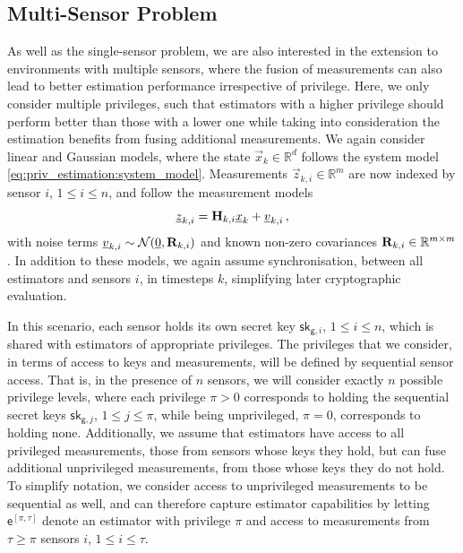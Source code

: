 \subsection{Multi-Sensor Problem}\label{subsec:priv_estimation:fusion_problem}
As well as the single-sensor problem, we are also interested in the extension to environments with multiple sensors, where the fusion of measurements can also lead to better estimation performance irrespective of privilege. Here, we only consider multiple privileges, such that estimators with a higher privilege should perform better than those with a lower one while taking into consideration the estimation benefits from fusing additional measurements. We again consider linear and Gaussian models, where the state $\vec{x}_k \in \mathbb{R}^d$ follows the system model \eqref{eq:priv_estimation:system_model}. Measurements $\vec{z}_{k,i} \in \mathbb{R}^m$ are now indexed by sensor $i$, $1\leq i\leq n$, and follow the measurement models
\begin{equation}\label{eq:priv_estimation:multi_sensor_measurement_models}
    {\underline{z}}_{k,i} = {{\mathbf{H}}}_{k,i} {\underline{x}}_k + {\underline{v}}_{k,i}\,,
\end{equation}
with noise terms ${\underline{v}}_{k,i} \sim \mathcal{N}({\underline{0}},{{\mathbf{R}}}_{k,i})$ and known non-zero covariances ${{\mathbf{R}}}_{k,i} \in \mathbb{R}^{m \times m}$. In addition to these models, we again assume synchronisation, between all estimators and sensors $i$, in timesteps $k$, simplifying later cryptographic evaluation.

In this scenario, each sensor holds its own secret key $\mathsf{sk}_{\mathsf{g}, i}$, $1\leq i\leq n$, which is shared with estimators of appropriate privileges. The privileges that we consider, in terms of access to keys and measurements, will be defined by sequential sensor access. That is, in the presence of $n$ sensors, we will consider exactly $n$ possible privilege levels, where each privilege $\pi>0$ corresponds to holding the sequential secret keys $\mathsf{sk}_{\mathsf{g},j}$, $1\leq j\leq \pi$, while being unprivileged, $\pi=0$, corresponds to holding none. Additionally, we assume that estimators have access to all privileged measurements, those from sensors whose keys they hold, but can fuse additional unprivileged measurements, from those whose keys they do not hold. To simplify notation, we consider access to unprivileged measurements to be sequential as well, and can therefore capture estimator capabilities by letting $\mathsf{e}^{[\pi,\tau]}$ denote an estimator with privilege $\pi$ and access to measurements from $\tau\geq\pi$ sensors $i$, $1\leq i\leq \tau$.

